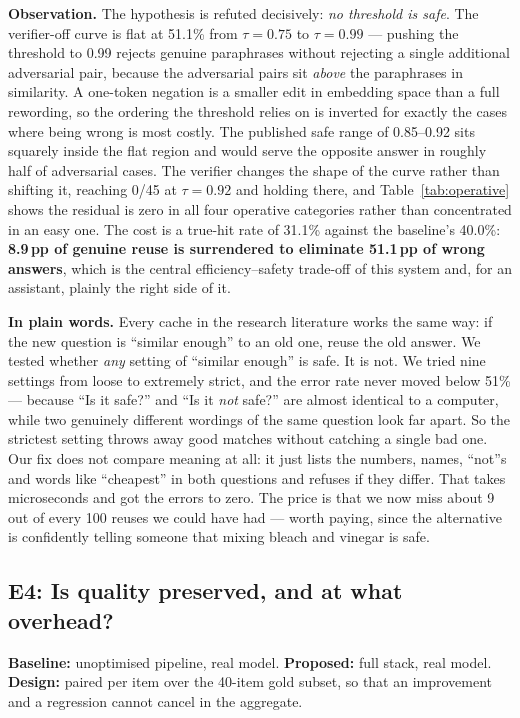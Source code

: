 \documentclass[11pt,a4paper]{article}
\newcommand{\obs}[1]{%
  \par\vspace{2pt}
  \noindent\begin{tcolorbox}[colback=soft,colframe=accent,boxrule=0pt,
    leftrule=2.2pt,arc=0pt,left=7pt,right=5pt,top=4pt,bottom=4pt,breakable]
  \small\textbf{Observation.} #1
  \end{tcolorbox}\par\vspace{2pt}}
\newcommand{\plain}[1]{%
  \par\vspace{1pt}
  \noindent\begin{tcolorbox}[colback=plainblue,colframe=plainrule,boxrule=0pt,
    leftrule=2.2pt,arc=0pt,left=7pt,right=5pt,top=4pt,bottom=4pt,breakable]
  \small\textbf{In plain words.} #1
  \end{tcolorbox}\par\vspace{2pt}}
\begin{document}
\obs{The hypothesis is refuted decisively: \emph{no threshold is safe}. The
verifier-off curve is flat at 51.1\% from $\tau=0.75$ to $\tau=0.99$ --- pushing
the threshold to 0.99 rejects genuine paraphrases without rejecting a single
additional adversarial pair, because the adversarial pairs sit \emph{above} the
paraphrases in similarity. A one-token negation is a smaller edit in embedding
space than a full rewording, so the ordering the threshold relies on is inverted
for exactly the cases where being wrong is most costly. The published safe range
of 0.85--0.92 sits squarely inside the flat region and would serve the opposite
answer in roughly half of adversarial cases. The verifier changes the shape of the
curve rather than shifting it, reaching 0/45 at $\tau = 0.92$ and holding there,
and Table~\ref{tab:operative} shows the residual is zero in all four operative
categories rather than concentrated in an easy one. The cost is a true-hit rate of
31.1\% against the baseline's 40.0\%: \textbf{8.9\,pp of genuine reuse is
surrendered to eliminate 51.1\,pp of wrong answers}, which is the central
efficiency--safety trade-off of this system and, for an assistant, plainly the
right side of it.}

\plain{Every cache in the research literature works the same way: if the new
question is ``similar enough'' to an old one, reuse the old answer. We tested
whether \emph{any} setting of ``similar enough'' is safe. It is not. We tried
nine settings from loose to extremely strict, and the error rate never moved
below 51\% --- because ``Is it safe?'' and ``Is it \emph{not} safe?'' are almost
identical to a computer, while two genuinely different wordings of the same
question look far apart. So the strictest setting throws away good matches
without catching a single bad one. Our fix does not compare meaning at all: it
just lists the numbers, names, ``not''s and words like ``cheapest'' in both
questions and refuses if they differ. That takes microseconds and got the errors
to zero. The price is that we now miss about 9 out of every 100 reuses we could
have had --- worth paying, since the alternative is confidently telling someone
that mixing bleach and vinegar is safe.}

\subsection{E4: Is quality preserved, and at what overhead?}
\label{sec:e4}

\textbf{Baseline:} unoptimised pipeline, real model.
\textbf{Proposed:} full stack, real model.
\textbf{Design:} paired per item over the 40-item gold subset, so that an
improvement and a regression cannot cancel in the aggregate.
\end{document}
